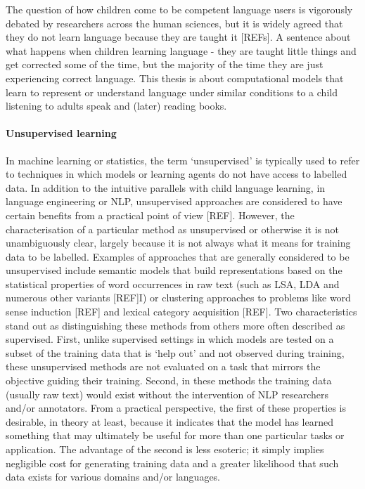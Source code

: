 
The question of how children come to be competent language users is vigorously debated by researchers across the human sciences, but it is widely agreed that they do not learn language because they are taught it [REFs].  A sentence about what happens when children learning language - they are taught little things and get corrected some of the time, but the majority of the time they are just experiencing correct language. This thesis is about computational models that learn to represent or understand language under similar conditions to a child listening to adults speak and (later) reading books.   

\paragraph{Unsupervised learning} In machine learning or statistics, the term `unsupervised' is typically used to refer to techniques in which models or learning agents do not have access to labelled data. In addition to the intuitive parallels with child language learning, in language engineering  or NLP, unsupervised approaches are considered to have certain benefits from a practical point of view [REF]. However, the characterisation of a particular method as unsupervised or otherwise it is not unambiguously clear, largely because it is not always what it means for training data to be labelled. Examples of approaches that are generally considered to be unsupervised include semantic models that build representations based on the statistical properties of word occurrences in raw text (such as LSA, LDA and numerous other variants [REF]I) or clustering approaches to problems like word sense induction [REF] and lexical category acquisition [REF]. Two characteristics stand out as distinguishing these methods from others more often described as supervised. First, unlike supervised settings in which models are tested on a subset of the training data that is `help out' and not observed during training, these unsupervised methods are not evaluated on a task that mirrors the objective guiding their training. Second, in these methods the training data (usually raw text) would exist without the intervention of NLP researchers and/or annotators. From a practical perspective, the first of these properties is desirable, in theory at least, because it indicates that the model has learned something that may ultimately be useful for more than one particular tasks or application. The advantage of the second is less esoteric; it simply implies negligible cost for generating training data and a greater likelihood that such data exists for various domains and/or languages.  

